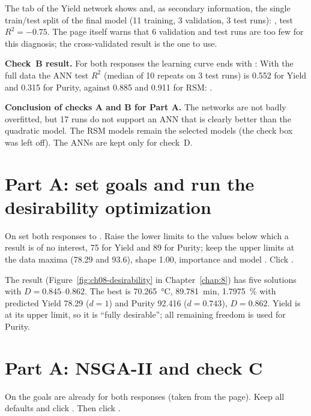 The  tab of the Yield network shows  and, as secondary information, the single train/test split of the final model (11 training,
3 validation, 3 test runs): , test $R^2=-0.75$. The page itself warns that 6 validation and test runs
are too few for this diagnosis; the cross-validated result is the one to use.

\textbf{Check~B result.} For both responses the learning curve ends with :  With the full data the ANN test $R^2$
(median of 10 repeats on 3 test runs) is 0.552 for Yield and 0.315 for Purity, against 0.885 and 0.911 for RSM:
.

\textbf{Conclusion of checks A and B for Part A.} The networks are not badly overfitted, but 17 runs do not support an
ANN that is clearly better than the quadratic model. The RSM models remain the selected models (the check box
 was left off). The ANNs are kept only for check~D.

\section{Part A: set goals and run the desirability optimization}
\label{sec:ch11-desir}
On  set both responses to . Raise the lower limits to the values below which a result
is of no interest, 75 for Yield and 89 for Purity; keep the upper limits at the data maxima (78.29 and 93.6), shape
1.00, importance \ui{+++} and model . Click .

The result (Figure~\ref{fig:ch08-desirability} in Chapter~\ref{chap:8}) has five solutions with $D=0.845$--$0.862$. The best is
70.265~°C, 89.781~min, 1.7975~\% with predicted Yield 78.29 ($d=1$) and Purity 92.416 ($d=0.743$), $D=0.862$. Yield is
at its upper limit, so it is ``fully desirable''; all remaining freedom is used for Purity.

\section{Part A: NSGA-II and check C}
\label{sec:ch11-nsga}
On  the goals are already  for both responses (taken from the  page).
Keep all defaults and click . Then click .

